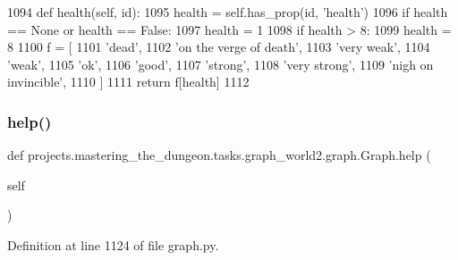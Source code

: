 \begin{DoxyCode}
1094     \textcolor{keyword}{def }health(self, id):
1095         health = self.has\_prop(id, \textcolor{stringliteral}{'health'})
1096         \textcolor{keywordflow}{if} health == \textcolor{keywordtype}{None} \textcolor{keywordflow}{or} health == \textcolor{keyword}{False}:
1097             health = 1
1098         \textcolor{keywordflow}{if} health > 8:
1099             health = 8
1100         f = [
1101             \textcolor{stringliteral}{'dead'},
1102             \textcolor{stringliteral}{'on the verge of death'},
1103             \textcolor{stringliteral}{'very weak'},
1104             \textcolor{stringliteral}{'weak'},
1105             \textcolor{stringliteral}{'ok'},
1106             \textcolor{stringliteral}{'good'},
1107             \textcolor{stringliteral}{'strong'},
1108             \textcolor{stringliteral}{'very strong'},
1109             \textcolor{stringliteral}{'nigh on invincible'},
1110         ]
1111         \textcolor{keywordflow}{return} f[health]
1112 
\end{DoxyCode}
\mbox{\label{classprojects_1_1mastering__the__dungeon_1_1tasks_1_1graph__world2_1_1graph_1_1Graph_a36381674cd448a339870939d058fe0ae}} 
\subsubsection{\texorpdfstring{help()}{help()}}
{\footnotesize\ttfamily def projects.\+mastering\+\_\+the\+\_\+dungeon.\+tasks.\+graph\+\_\+world2.\+graph.\+Graph.\+help (\begin{DoxyParamCaption}\item[{}]{self }\end{DoxyParamCaption})}



Definition at line 1124 of file graph.\+py.


